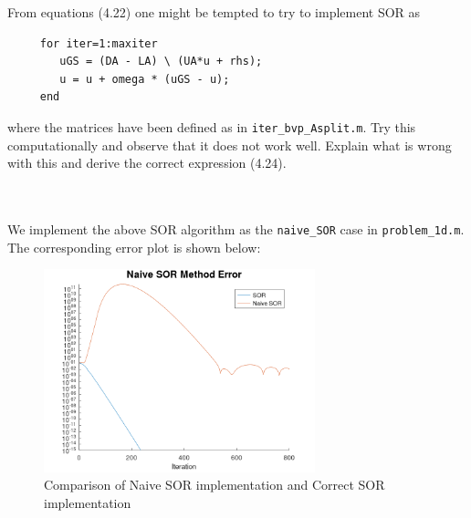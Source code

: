 From equations (4.22) one might be tempted to try to implement SOR as
\begin{verbatim}
     for iter=1:maxiter
        uGS = (DA - LA) \ (UA*u + rhs);
        u = u + omega * (uGS - u);
     end
\end{verbatim}

where the matrices have been defined as in \verb+iter_bvp_Asplit.m+. Try this computationally and observe that it does
not work well. Explain what is wrong with this and derive the correct expression (4.24).

\begin{solution}\ \\\\
    We implement the above SOR algorithm as the \texttt{naive\_SOR} case in \texttt{problem\_1d.m}. The corresponding
    error plot is shown below:

    \begin{figure}[h]
        \centering
        \includegraphics[width=0.7\textwidth]{problem_1d_naive_sor_matrix_splitting_error_800_iterations.png}
        \caption{Comparison of Naive SOR implementation and Correct SOR implementation}
    \end{figure}

    \ \\
\end{solution}